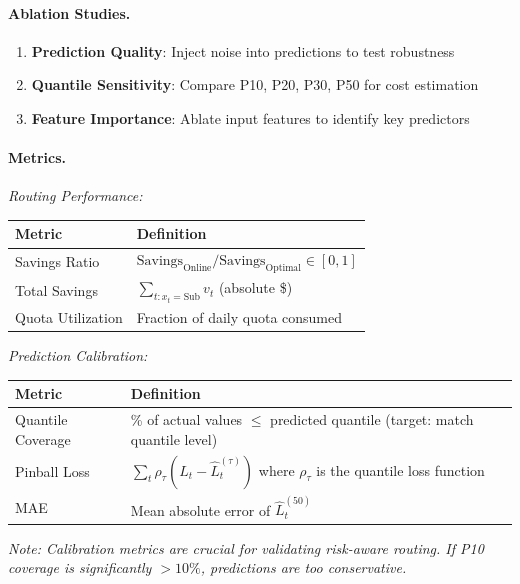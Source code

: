 \documentclass[11pt]{article}
\begin{document}
\paragraph{Ablation Studies.}
\begin{enumerate}
  \item \textbf{Prediction Quality}: Inject noise into predictions to test robustness
  \item \textbf{Quantile Sensitivity}: Compare P10, P20, P30, P50 for cost estimation
  \item \textbf{Feature Importance}: Ablate input features to identify key predictors
\end{enumerate}

\paragraph{Metrics.}

\emph{Routing Performance:}
\begin{center}
\begin{tabular}{|l|l|}
\hline
\textbf{Metric} & \textbf{Definition} \\
\hline
Savings Ratio & $\text{Savings}_{\text{Online}} / \text{Savings}_{\text{Optimal}} \in [0,1]$ \\
Total Savings & $\sum_{t: x_t = \text{Sub}} v_t$ (absolute \$) \\
Quota Utilization & Fraction of daily quota consumed \\
\hline
\end{tabular}
\end{center}

\emph{Prediction Calibration:}
\begin{center}
\begin{tabular}{|l|l|}
\hline
\textbf{Metric} & \textbf{Definition} \\
\hline
Quantile Coverage & \% of actual values $\leq$ predicted quantile (target: match quantile level) \\
Pinball Loss & $\sum_t \rho_\tau (L_t - \hat{L}^{(\tau)}_t)$ where $\rho_\tau$ is the quantile loss function \\
MAE & Mean absolute error of $\hat{L}^{(50)}_t$ \\
\hline
\end{tabular}
\end{center}

\emph{Note: Calibration metrics are crucial for validating risk-aware routing. If P10 coverage is significantly $>10\%$, predictions are too conservative.}
\end{document}
